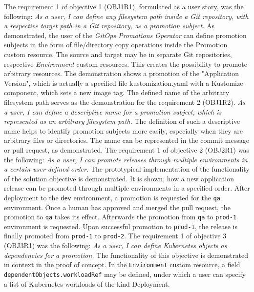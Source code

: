 The requirement 1 of objective 1 (OBJ1R1), formulated as a user story,
was the following:
\textit{As a user, I can define any filesystem path inside a Git repository, with a respective target path in a Git repository, as a promotion subject.}
As demonstrated,
the user of the \textit{GitOps Promotions Operator} can define promotion subjects
in the form of file/directory copy operations inside the Promotion custom resource.
The source and target may be in separate Git repositories, respective \textit{Environment} custom resources.
This creates the possibility to promote arbitrary resources.
The demonstration shows a promotion of the "Application Version",
which is actually a specified file kustomization.yaml with a Kustomize component,
which sets a new image tag.
The defined name of the arbitrary filesystem path serves as the demonstration for the requirement 2 (OBJ1R2).
\textit{As a user, I can define a descriptive name for a promotion subject, which is represented as an arbitrary filesystem path.}
The definition of such a descriptive name helps to identify promotion subjects more easily, especially when
they are arbitrary files or directories. The name can be represented in the commit message or pull request, as demonstrated.
The requirement 1 of objective 2 (OBJ2R1) was the following:
\textit{As a user, I can promote releases through multiple environments in a certain user-defined order.}
The prototypical implementation of the functionality of the solution objective is demonstrated.
It is shown, how a new application release can be promoted through multiple environments in a specified order.
After deployment to the \lstinline|dev| environment, a promotion is requested for the \lstinline|qa| environment.
Once a human has approved and merged the pull request, the promotion to \lstinline|qa| takes its effect.
Afterwards the promotion from \lstinline|qa| to \lstinline|prod-1| environment is requested. Upon successful promotion to \lstinline|prod-1|,
the release is finally promoted from \lstinline|prod-1| to \lstinline|prod-2|.
The requirement 1 of objective 3 (OBJ3R1) was the following:
\textit{As a user, I can define Kubernetes objects as dependencies for a promotion.}
The functionality of this objective is demonstrated in context in the proof of concept.
In the \lstinline|Environment| custom resource,
a field
\lstinline|dependentObjects.workloadRef| may be defined, under which a user can specify
a list of Kubernetes workloads of the kind Deployment.
